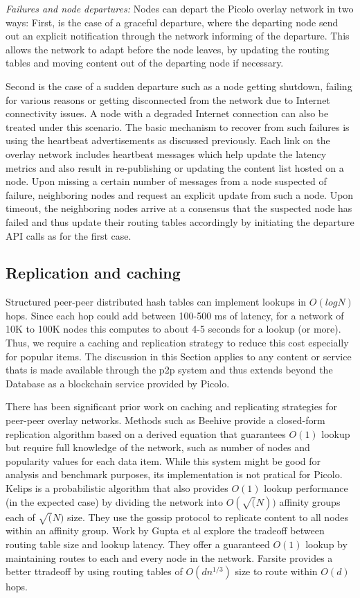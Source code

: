 {\em Failures and node departures:} Nodes can depart the Picolo overlay network in two ways: First, is the case of a
graceful departure, where the departing node send out an explicit notification through the network informing of the
departure. This allows the network to adapt before the node leaves, by updating the routing tables and moving content
out of the departing node if necessary.

Second is the case of a sudden departure such as a node getting shutdown, failing for various reasons or getting
disconnected from the network due to Internet connectivity issues. A node with a degraded Internet connection can also
be treated under this scenario. The basic mechanism to recover from such failures is using the heartbeat advertisements
as discussed previously. Each link on the overlay network includes heartbeat messages which help update the latency
metrics and also result in re-publishing or updating the content list hosted on a node. Upon missing a certain number of
messages from a node suspected of failure, neighboring nodes and request an explicit update from such a node. Upon
timeout, the neighboring nodes arrive at a consensus that the suspected node has failed and thus update their routing
tables accordingly by initiating the departure API calls as for the first case.

\subsection{Replication and caching}
\label{net:replication}
Structured peer-peer distributed hash tables can implement lookups in \( O(log N)\) hops. Since each hop could add between 100-500
ms of latency, for a network of 10K to 100K nodes this computes to about 4-5 seconds for a lookup (or more). Thus, we
require a caching and replication strategy to reduce this cost especially for popular items. The discussion in this
Section applies to any content or service thats is made available through the p2p system and thus extends beyond the
Database as a blockchain service provided by Picolo.

There has been significant prior work on caching and replicating strategies for peer-peer overlay networks. Methods such
as Beehive \cite{beehive} provide a closed-form replication algorithm based on a derived equation that guarantees
\(O(1)\) lookup but require full knowledge of the network, such as number of nodes and popularity values for each data
item. While this system might be good for analysis and benchmark purposes, its implementation is not pratical for
Picolo. Kelips \cite{kelips} is a probabilistic algorithm that also provides \(O(1)\) lookup performance (in the
expected case) by dividing the network into \(O(\sqrt(N))\) affinity groups each of \(\sqrt(N)\) size. They use the
gossip protocol to replicate content to all nodes within an affinity group. Work by Gupta et al \cite{one_hop_lookup}
explore the tradeoff between routing table size and lookup latency. They offer a guaranteed \(O(1)\) lookup by
maintaining routes to each and every node in the network. Farsite \cite{farsite} provides a better ttradeoff by using
routing tables of \(O(dn^{1/3})\) size to route within \(O(d)\) hops.

